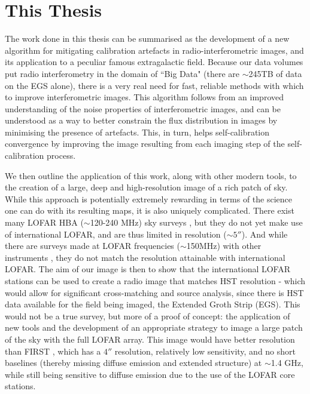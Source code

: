 \clearpage


\clearpage
\section{This Thesis}

\pg
The work done in this thesis can be summarised as the development of a new algorithm for mitigating calibration artefacts in radio-interferometric images, and its application to a peculiar famous extragalactic field. Because our data volumes put radio interferometry in the domain of ``Big Data" (there are $\sim$245TB of data on the EGS alone), there is a very real need for fast, reliable methods with which to improve interferometric images. This algorithm follows from an improved understanding of the noise properties of interferometric images, and can be understood as a way to better constrain the flux distribution in images by minimising the presence of artefacts. This, in turn, helps self-calibration convergence by improving the image resulting from each imaging step of the self-calibration process. 

\pg
We then outline the application of this work, along with other modern tools, to the creation of a large, deep and high-resolution image of a rich patch of sky. While this approach is potentially extremely rewarding in terms of the science one can do with its resulting maps, it is also uniquely complicated. There exist many LOFAR HBA ($\sim$120-240 MHz) sky surveys , but they do not yet make use of international LOFAR, and are thus limited in resolution ($\sim 5''$). And while there are surveys made at LOFAR frequencies ($\sim$150MHz) with other instruments , they do not match the resolution attainable with international LOFAR. The aim of our image is then to show that the international LOFAR stations can be used to create a radio image that matches HST resolution - which would allow for significant cross-matching and source analysis, since there is HST data available for the field being imaged, the Extended Groth Strip (EGS). This would not be a true survey, but more of a proof of concept: the application of new tools and the development of an appropriate strategy to image a large patch of the sky with the full LOFAR array. This image would have better resolution than FIRST , which has a $4''$ resolution, relatively low sensitivity, and no short baselines (thereby missing diffuse emission and extended structure) at $\sim$1.4 GHz, while still being sensitive to diffuse emission due to the use of the LOFAR core stations. 

